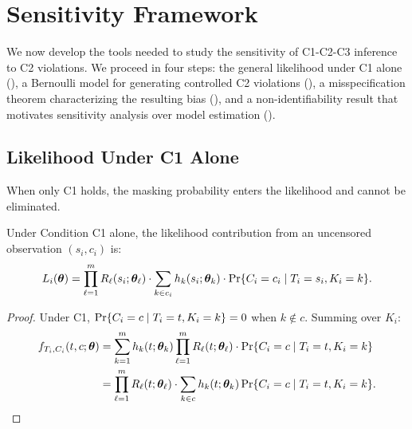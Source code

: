 \section{Sensitivity Framework}
\label{sec:framework}

We now develop the tools needed to study the sensitivity of C1-C2-C3 inference
to C2 violations. We proceed in four steps: the general likelihood under C1
alone (), a Bernoulli model for generating controlled C2
violations (), a misspecification theorem characterizing
the resulting bias (), and a non-identifiability result that
motivates sensitivity analysis over model estimation ().

\subsection{Likelihood Under C1 Alone}
\label{sec:like-C1}

When only C1 holds, the masking probability enters the likelihood and cannot
be eliminated.

\begin{theorem}
\label{thm:like-C1}
Under Condition C1 alone, the likelihood contribution from an uncensored
observation $(s_i, c_i)$ is:
\begin{equation}
\label{eq:like-C1}
    L_i(\bm{\theta}) = \prod_{\ell=1}^m R_\ell(s_i; \bm{\theta}_\ell) \cdot
    \sum_{k \in c_i} h_k(s_i; \bm{\theta}_k) \cdot
    \mathrm{Pr}\{C_i = c_i \mid T_i = s_i, K_i = k\}.
\end{equation}
\end{theorem}

\begin{proof}
Under C1, $\mathrm{Pr}\{C_i = c \mid T_i = t, K_i = k\} = 0$ when $k \notin c$.
Summing over $K_i$:
\begin{align}
    f_{T_i, C_i}(t, c; \bm{\theta})
    &= \sum_{k=1}^m h_k(t; \bm{\theta}_k) \prod_{\ell=1}^m R_\ell(t; \bm{\theta}_\ell)
        \cdot \mathrm{Pr}\{C_i = c \mid T_i = t, K_i = k\} \notag \\
    &= \prod_{\ell=1}^m R_\ell(t; \bm{\theta}_\ell) \cdot
        \sum_{k \in c} h_k(t; \bm{\theta}_k)\,
        \mathrm{Pr}\{C_i = c \mid T_i = t, K_i = k\}. \qedhere
\end{align}
\end{proof}

